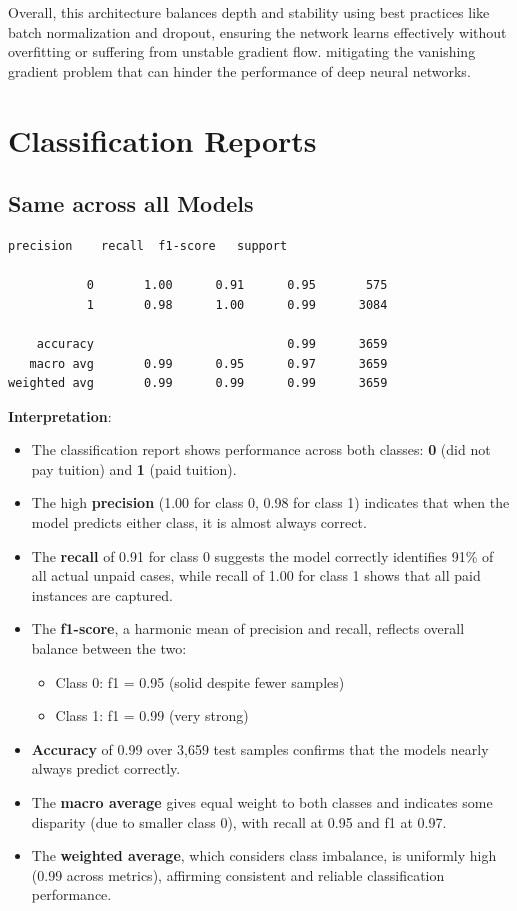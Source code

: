 \documentclass{article}
\begin{document}
\noindent Overall, this architecture balances depth and stability using best practices like batch normalization and dropout, ensuring the network learns effectively without overfitting or suffering from unstable gradient flow.
mitigating the vanishing gradient problem that can hinder the performance of deep neural networks.

\newpage
\section{Classification Reports}

\subsection*{Same across all Models}
\begin{Verbatim}[fontsize=\small]
              precision    recall  f1-score   support

           0       1.00      0.91      0.95       575
           1       0.98      1.00      0.99      3084

    accuracy                           0.99      3659
   macro avg       0.99      0.95      0.97      3659
weighted avg       0.99      0.99      0.99      3659
\end{Verbatim}

\textbf{Interpretation}:
\begin{itemize}
    \item The classification report shows performance across both classes: \textbf{0} (did not pay tuition) and \textbf{1} (paid tuition).
    \item The high \textbf{precision} (1.00 for class 0, 0.98 for class 1) indicates that when the model predicts either class, it is almost always correct.
    \item The \textbf{recall} of 0.91 for class 0 suggests the model correctly identifies 91\% of all actual unpaid cases, while recall of 1.00 for class 1 shows that all paid instances are captured.
    \item The \textbf{f1-score}, a harmonic mean of precision and recall, reflects overall balance between the two:
    \begin{itemize}
        \item Class 0: f1 = 0.95 (solid despite fewer samples)
        \item Class 1: f1 = 0.99 (very strong)
    \end{itemize}
    \item \textbf{Accuracy} of 0.99 over 3,659 test samples confirms that the models nearly always predict correctly.
    \item The \textbf{macro average} gives equal weight to both classes and indicates some disparity (due to smaller class 0), with recall at 0.95 and f1 at 0.97.
    \item The \textbf{weighted average}, which considers class imbalance, is uniformly high (0.99 across metrics), affirming consistent and reliable classification performance.
\end{itemize}
\end{document}
